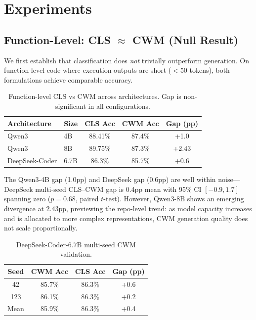 \documentclass[11pt]{article}
\begin{document}
\section{Experiments}

\subsection{Function-Level: CLS $\approx$ CWM (Null Result)}
\label{sec:func-level}

We first establish that classification does \emph{not} trivially outperform generation. On function-level code where execution outputs are short ($<$50 tokens), both formulations achieve comparable accuracy.

\begin{table}[h]
\centering
\caption{Function-level CLS vs CWM across architectures. Gap is non-significant in all configurations.}
\label{tab:func-level}
\begin{tabular}{llccc}
\toprule
Architecture & Size & CLS Acc & CWM Acc & Gap (pp) \\
\midrule
Qwen3 & 4B & 88.41\% & 87.4\% & +1.0 \\
Qwen3 & 8B & 89.75\% & 87.3\% & +2.43 \\
DeepSeek-Coder & 6.7B & 86.3\% & 85.7\% & +0.6 \\
\bottomrule
\end{tabular}
\end{table}

The Qwen3-4B gap (1.0pp) and DeepSeek gap (0.6pp) are well within noise---DeepSeek multi-seed CLS--CWM gap is 0.4pp mean with 95\% CI $[-0.9, 1.7]$ spanning zero ($p=0.68$, paired $t$-test). However, Qwen3-8B shows an emerging divergence at 2.43pp, previewing the repo-level trend: as model capacity increases and is allocated to more complex representations, CWM generation quality does not scale proportionally.

\begin{table}[h]
\centering
\caption{DeepSeek-Coder-6.7B multi-seed CWM validation.}
\label{tab:deepseek-multiseed}
\begin{tabular}{cccc}
\toprule
Seed & CWM Acc & CLS Acc & Gap (pp) \\
\midrule
42 & 85.7\% & 86.3\% & +0.6 \\
123 & 86.1\% & 86.3\% & +0.2 \\
\midrule
Mean & 85.9\% & 86.3\% & +0.4 \\
\bottomrule
\end{tabular}
\end{table}
\end{document}
